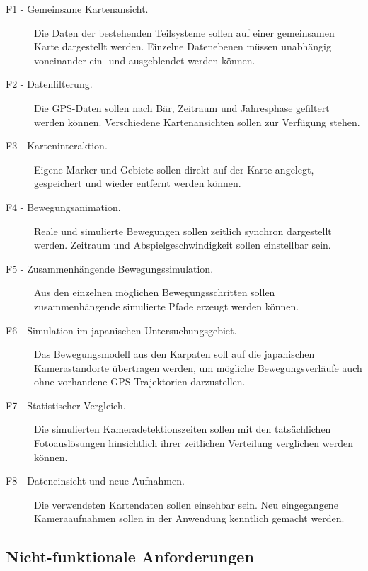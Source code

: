 \documentclass[12pt,a4paper]{report}
\begin{document}
\begin{description}

    \item[F1 - Gemeinsame Kartenansicht.]
    Die Daten der bestehenden Teilsysteme sollen auf einer gemeinsamen
    Karte dargestellt werden. Einzelne Datenebenen müssen unabhängig
    voneinander ein- und ausgeblendet werden können.

    \item[F2 - Datenfilterung.]
    Die GPS-Daten sollen nach Bär, Zeitraum und Jahresphase gefiltert
    werden können. Verschiedene Kartenansichten sollen zur Verfügung stehen.

    \item[F3 - Karteninteraktion.]
    Eigene Marker und Gebiete sollen direkt auf der Karte angelegt,
    gespeichert und wieder entfernt werden können.

    \item[F4 - Bewegungsanimation.]
    Reale und simulierte Bewegungen sollen zeitlich synchron
    dargestellt werden. Zeitraum und Abspielgeschwindigkeit sollen
    einstellbar sein.

    \item[F5 - Zusammenhängende Bewegungssimulation.]
    Aus den einzelnen möglichen Bewegungsschritten sollen
    zusammenhängende simulierte Pfade erzeugt werden können.

    \item[F6 - Simulation im japanischen Untersuchungsgebiet.]
    Das Bewegungsmodell aus den Karpaten soll auf die japanischen
    Kamerastandorte übertragen werden, um mögliche Bewegungsverläufe
    auch ohne vorhandene GPS-Trajektorien darzustellen.

    \item[F7 - Statistischer Vergleich.]
    Die simulierten Kameradetektionszeiten sollen mit den tatsächlichen
    Fotoauslösungen hinsichtlich ihrer zeitlichen Verteilung
    verglichen werden können.

    \item[F8 - Dateneinsicht und neue Aufnahmen.]
    Die verwendeten Kartendaten sollen einsehbar sein. Neu
    eingegangene Kameraaufnahmen sollen in der Anwendung
    kenntlich gemacht werden.

\end{description}

\subsection{Nicht-funktionale Anforderungen}
\end{document}
